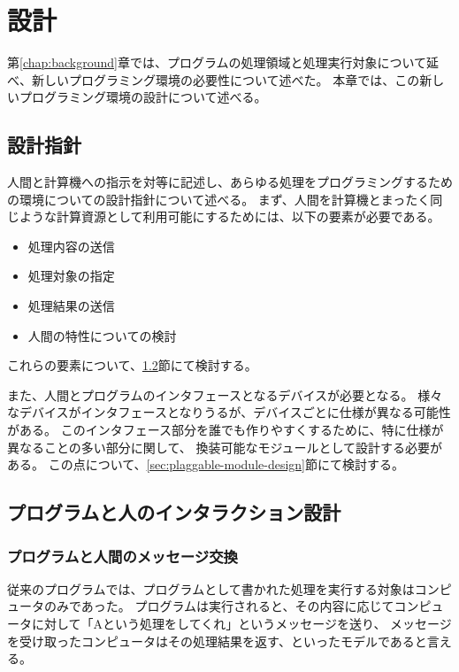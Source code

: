 \chapter{設計}\label{chap:design}

第\ref{chap:background}章では、プログラムの処理領域と処理実行対象について延べ、新しいプログラミング環境の必要性について述べた。
本章では、この新しいプログラミング環境の設計について述べる。

\section{設計指針}\label{ux8a2dux8a08ux6307ux91dd}

人間と計算機への指示を対等に記述し、あらゆる処理をプログラミングするための環境についての設計指針について述べる。
まず、人間を計算機とまったく同じような計算資源として利用可能にするためには、以下の要素が必要である。

\begin{itemize}
\itemsep1pt\parskip0pt
\item
  処理内容の送信
\item
  処理対象の指定
\item
  処理結果の送信
\item
  人間の特性についての検討
\end{itemize}

これらの要素について、\ref{sec:program-human-interaction-design}節にて検討する。

また、人間とプログラムのインタフェースとなるデバイスが必要となる。
様々なデバイスがインタフェースとなりうるが、デバイスごとに仕様が異なる可能性がある。
このインタフェース部分を誰でも作りやすくするために、特に仕様が異なることの多い部分に関して、
換装可能なモジュールとして設計する必要がある。
この点について、\ref{sec:plaggable-module-design}節にて検討する。

\section{プログラムと人のインタラクション設計}\label{sec:program-human-interaction-design}

\subsection{プログラムと人間のメッセージ交換}\label{ux30d7ux30edux30b0ux30e9ux30e0ux3068ux4ebaux9593ux306eux30e1ux30c3ux30bbux30fcux30b8ux4ea4ux63db}

従来のプログラムでは、プログラムとして書かれた処理を実行する対象はコンピュータのみであった。
プログラムは実行されると、その内容に応じてコンピュータに対して「Aという処理をしてくれ」というメッセージを送り、
メッセージを受け取ったコンピュータはその処理結果を返す、といったモデルであると言える。

